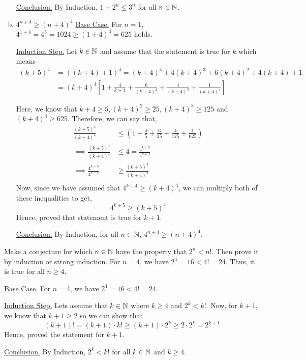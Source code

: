 \begin{enumerate}[(a).]
		\underline{Conclusion.} By Induction, $1 + 2^n \leq 3^n$ for all $n \in \mathbb{N}$.
		\es

	\item $4^{n+4} \geq (n+4)^4$
		\bs
		\underline{Base Case.} For $n = 1$, $4^{1+4} = 4^5 = 1024 \geq (1+4)^4 = 625$ holds.

		\underline{Induction Step.} Let $k \in \mathbb{N}$ and assume that the statement is true for $k$ which means
		\begin{align*}
			(k+5)^4 &= ((k+4)+1)^4 = (k+4)^4 + 4(k+4)^3 + 6(k+4)^2 + 4(k+4) + 1 \\
							&= (k+4)^4 \left[ 1 + \frac{4}{k+4} + \frac{6}{(k+4)^2} + \frac{4}{(k+4)^3} + \frac{1}{(k+4)^4} \right]
		\end{align*}

		Here, we know that $k+4 \geq 5, (k+4)^2 \geq 25, (k+4)^3 \geq 125$ and $(k+4)^4 \geq 625$. Therefore, we can say that,
		\begin{align*}
			\frac{(k+5)^4}{(k+4)^4} &\leq \left( 1 + \frac{4}{5} + \frac{6}{25} + \frac{4}{125} + \frac{1}{625} \right) \\
			\implies \frac{(k+5)^4}{(k+4)^4} &\leq 4 = \frac{4^{k+5}}{4^{k+4}} \\
			\implies \frac{4^{k+5}}{4^{k+4}} &\geq \frac{(k+5)^4}{(k+4)^4} \\
		\end{align*}
		Now, since we have assumed that $4^{k+4} \geq (k+4)^4$, we can multiply both of these inequalities to get,
		$$4^{k+5} \geq (k+5)^4$$
		Hence, proved that statement is true for $k+1$.

		\underline{Conclusion.} By Induction, for all $n \in \mathbb{N}$, $4^{n+4} \geq (n+4)^4$.
	 	\es
\end{enumerate}
\ep

\bp
Make a conjecture for which $n \in \mathbb{N}$ have the property that $2^n < n!$. Then prove it by induction or strong induction.
\ep
\bs
For $n = 4$, we have $2^4 = 16 < 4! = 24$. Thus, it is true for all $n \geq 4$.

\underline{Base Case.} For $n = 4$, we have $2^4 = 16 < 4! = 24$.

\underline{Induction Step.} Lets assume that $k \in \mathbb{N}$ where $k \geq 4$ and $2^k < k!$. Now, for $k+1$, we know that $k+1 \geq 2$ so we can show that
$$(k+1)! = (k+1)\cdot k! \geq (k+1) \cdot 2^k \geq 2 \cdot 2^k = 2^{k+1}$$
Hence, proved the statement for $k+1$.

\underline{Conclusion.} By Induction, $2^k < k!$ for all $k \in \mathbb{N}$ and $k \geq 4$.
\es

